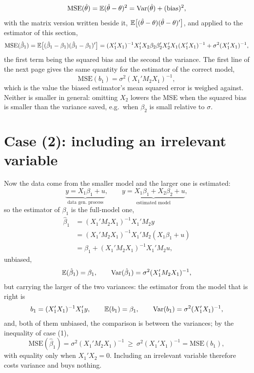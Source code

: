 \documentclass[11pt]{article}
\begin{document}
\[ \text{MSE}(\hat{\theta}) = \mathbb{E}(\hat{\theta} - \theta)^{2}
   = \operatorname{Var}(\hat{\theta}) + (\text{bias})^{2}, \]
with the matrix version written beside it,
$\mathbb{E}\bigl[(\hat{\theta} - \theta)(\hat{\theta} - \theta)'\bigr]$, and applied to the
estimator of this section,
\[
\text{MSE}(\hat{\beta}_{1}) = \mathbb{E}\bigl[(\hat{\beta}_{1} - \beta_{1})(\hat{\beta}_{1} - \beta_{1})'\bigr]
= (X_{1}'X_{1})^{-1}X_{1}'X_{2}\beta_{2}\beta_{2}'X_{2}'X_{1}(X_{1}'X_{1})^{-1}
  + \sigma^{2}(X_{1}'X_{1})^{-1},
\]
the first term being the squared bias and the second the variance. The first line of
the next page gives the same quantity for the estimator of the correct model,
\[ \text{MSE}(b_{1}) = \sigma^{2}(X_{1}'M_{2}X_{1})^{-1}, \]
which is the value the biased estimator's mean squared error is weighed against.
Neither is smaller in general: omitting $X_{2}$ lowers the MSE when the squared bias
is smaller than the variance saved, e.g.\ when $\beta_{2}$ is small relative to
$\sigma$.

\section{Case (2): including an irrelevant variable}

Now the data come from the smaller model and the larger one is estimated:
\[ \underbrace{y = X_{1}\beta_{1} + u}_{\text{data gen.\ process}}, \qquad
   \underbrace{y = X_{1}\beta_{1} + X_{2}\beta_{2} + u}_{\text{estimated model}}, \]
so the estimator of $\beta_{1}$ is the full-model one,
\[
\begin{aligned}
\hat{\beta}_{1} &= (X_{1}'M_{2}X_{1})^{-1}X_{1}'M_{2}y\\
            &= (X_{1}'M_{2}X_{1})^{-1}X_{1}'M_{2}(X_{1}\beta_{1} + u)\\
            &= \beta_{1} + (X_{1}'M_{2}X_{1})^{-1}X_{1}'M_{2}u,
\end{aligned}
\]
unbiased,
\[ \mathbb{E}(\hat{\beta}_{1}) = \beta_{1}, \qquad
   \operatorname{Var}(\hat{\beta}_{1}) = \sigma^{2}(X_{1}'M_{2}X_{1})^{-1}, \]
but carrying the larger of the two variances: the estimator from the model that is
right is
\[ b_{1} = (X_{1}'X_{1})^{-1}X_{1}'y, \qquad \mathbb{E}(b_{1}) = \beta_{1}, \qquad
   \operatorname{Var}(b_{1}) = \sigma^{2}(X_{1}'X_{1})^{-1}, \]
and, both of them unbiased, the comparison is between the variances; by the
inequality of case (1),
\[ \text{MSE}(\hat{\beta}_{1}) = \sigma^{2}(X_{1}'M_{2}X_{1})^{-1}
   \ \ge\ \sigma^{2}(X_{1}'X_{1})^{-1} = \text{MSE}(b_{1}), \]
with equality only when $X_{1}'X_{2} = 0$.
Including an irrelevant variable therefore costs variance and buys nothing.
\end{document}
